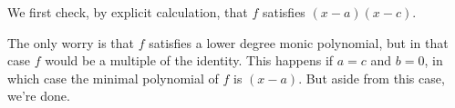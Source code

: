 \documentclass{homework}
\begin{document}
\begin{solution}
  We first check, by explicit calculation, that $f$ satisfies $(x-a)(x-c)$.

  The only worry is that $f$ satisfies a lower degree monic
  polynomial, but in that case $f$ would be a multiple of the
  identity.  This happens if $a = c$ and $b = 0$, in which case the
  minimal polynomial of $f$ is $(x-a)$.  But aside from this case,
  we're done.
\end{solution}
\end{document}
